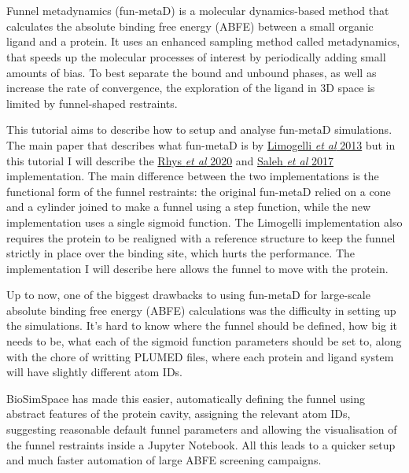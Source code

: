 \hypertarget{funnel-metadynamics-tutorial}{%
\section{}\label{funnel-metadynamics-tutorial}}

Funnel metadynamics (fun-metaD) is a molecular dynamics-based method
that calculates the absolute binding free energy (ABFE) between a small
organic ligand and a protein. It uses an enhanced sampling method called
metadynamics, that speeds up the molecular processes of interest by
periodically adding small amounts of bias. To best separate the bound
and unbound phases, as well as increase the rate of convergence, the
exploration of the ligand in 3D space is limited by funnel-shaped
restraints.

This tutorial aims to describe how to setup and analyse fun-metaD
simulations. The main paper that describes what fun-metaD is by
\href{https://www.pnas.org/content/110/16/6358}{Limogelli \emph{et al}
2013} but in this tutorial I will describe the
\href{https://www.ncbi.nlm.nih.gov/pmc/articles/PMC7467642/}{Rhys
\emph{et al} 2020} and
\href{https://pubs.acs.org/doi/10.1021/acs.jcim.6b00772}{Saleh \emph{et
al} 2017} implementation. The main difference between the two
implementations is the functional form of the funnel restraints: the
original fun-metaD relied on a cone and a cylinder joined to make a
funnel using a step function, while the new implementation uses a single
sigmoid function. The Limogelli implementation also requires the protein
to be realigned with a reference structure to keep the funnel strictly
in place over the binding site, which hurts the performance. The
implementation I will describe here allows the funnel to move with the
protein.

Up to now, one of the biggest drawbacks to using fun-metaD for
large-scale absolute binding free energy (ABFE) calculations was the
difficulty in setting up the simulations. It's hard to know where the
funnel should be defined, how big it needs to be, what each of the
sigmoid function parameters should be set to, along with the chore of
writting PLUMED files, where each protein and ligand system will have
slightly different atom IDs.

BioSimSpace has made this easier, automatically defining the funnel
using abstract features of the protein cavity, assigning the relevant
atom IDs, suggesting reasonable default funnel parameters and allowing
the visualisation of the funnel restraints inside a Jupyter Notebook.
All this leads to a quicker setup and much faster automation of large
ABFE screening campaigns.

